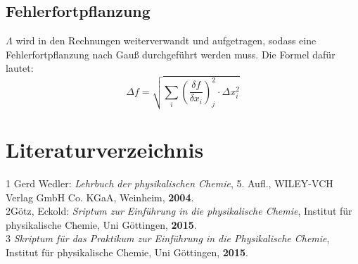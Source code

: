 \documentclass[12pt,a4paper,titlepage,headinclude,bibtotoc]{scrartcl}
\begin{document}
\subsection{Fehlerfortpflanzung}
$\Lambda$ wird in den Rechnungen weiterverwandt und aufgetragen, sodass eine Fehlerfortpflanzung nach Gauß durchgeführt werden muss. Die Formel dafür lautet:\\

\begin{equation}
\Delta f = \sqrt{\sum_i \left(\frac{\delta f}{\delta x_i}\right)^2_j \cdot \Delta x_i^2}
\end{equation}





\newpage

\section{Literaturverzeichnis}
\begin{flushleft}
1 \quad Gerd Wedler: \emph{Lehrbuch der physikalischen Chemie}, 5. Aufl., WILEY-VCH Verlag GmbH Co. KGaA, Weinheim, \textbf{2004}.\\
\vspace{0,5 cm}
2\quad Götz, Eckold: \emph{Sriptum zur Einführung in die physikalische Chemie}, Institut für physikalische Chemie, Uni Göttingen, \textbf{2015}.\\
\vspace{0,5 cm}
3 \quad \emph{Skriptum für das Praktikum zur Einführung in die Physikalische Chemie}, Institut für physikalische Chemie, Uni Göttingen, \textbf{2015}.\\
\end{flushleft}
\end{document}
